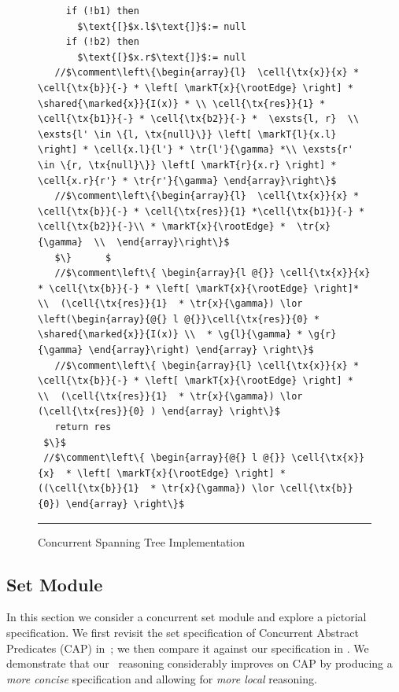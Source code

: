 \begin{figure}
\begin{lstlisting}
     if (!b1) then 
       $\text{[}$x.l$\text{]}$:= null
     if (!b2) then 
       $\text{[}$x.r$\text{]}$:= null
   //$\comment\left\{\begin{array}{l}  \cell{\tx{x}}{x} * \cell{\tx{b}}{-} * \left[ \markT{x}{\rootEdge} \right] * \shared{\marked{x}}{I(x)} * \\ \cell{\tx{res}}{1} * \cell{\tx{b1}}{-} * \cell{\tx{b2}}{-} *  \exsts{l, r}  \\ \exsts{l' \in \{l, \tx{null}\}} \left[ \markT{l}{x.l} \right] * \cell{x.l}{l'} * \tr{l'}{\gamma} *\\ \exsts{r' \in \{r, \tx{null}\}} \left[ \markT{r}{x.r} \right] * \cell{x.r}{r'} * \tr{r'}{\gamma} \end{array}\right\}$  
   //$\comment\left\{\begin{array}{l}  \cell{\tx{x}}{x} * \cell{\tx{b}}{-} * \cell{\tx{res}}{1} *\cell{\tx{b1}}{-} * \cell{\tx{b2}}{-}\\ * \markT{x}{\rootEdge} *  \tr{x}{\gamma}  \\  \end{array}\right\}$         
   $\}		$
   //$\comment\left\{ \begin{array}{l @{}} \cell{\tx{x}}{x} * \cell{\tx{b}}{-} * \left[ \markT{x}{\rootEdge} \right]*  \\  (\cell{\tx{res}}{1}  * \tr{x}{\gamma}) \lor \left(\begin{array}{@{} l @{}}\cell{\tx{res}}{0} * \shared{\marked{x}}{I(x)} \\  * \g{l}{\gamma} * \g{r}{\gamma} \end{array}\right) \end{array} \right\}$ 
   //$\comment\left\{ \begin{array}{l} \cell{\tx{x}}{x} * \cell{\tx{b}}{-} * \left[ \markT{x}{\rootEdge} \right] *  \\  (\cell{\tx{res}}{1}  * \tr{x}{\gamma}) \lor (\cell{\tx{res}}{0} ) \end{array} \right\}$      
   return res
 $\}$
 //$\comment\left\{ \begin{array}{@{} l @{}} \cell{\tx{x}}{x}  * \left[ \markT{x}{\rootEdge} \right] *  ((\cell{\tx{b}}{1}  * \tr{x}{\gamma}) \lor \cell{\tx{b}}{0}) \end{array} \right\}$         
\end{lstlisting}
\hrule\vspace*{5pt}
\caption{Concurrent Spanning Tree Implementation}
\label{fig:conSpanningTree}
\end{figure}
%
%
\subsection{Set Module}
\label{sec:set}
In this section we consider a concurrent set module and explore a pictorial specification. We first revisit the set specification of Concurrent Abstract Predicates (CAP) in~\cite{cap-ecoop10}; we then compare it against our specification in \colosl. We demonstrate that our \colosl\ reasoning considerably improves on CAP by producing a \emph{more concise} specification and allowing for \emph{more local} reasoning. 


